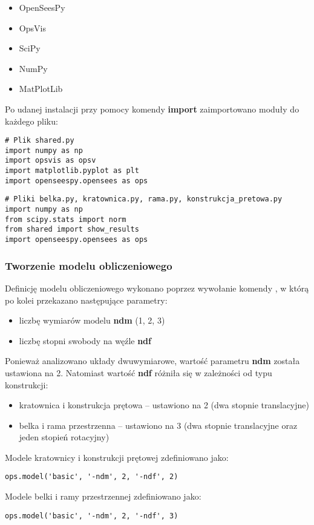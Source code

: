 \begin{itemize}
    \item OpenSeesPy
    \item OpsVis
    \item SciPy
    \item NumPy
    \item MatPlotLib
\end{itemize}

Po udanej instalacji przy pomocy komendy \textbf{import} zaimportowano moduły do każdego pliku:

\begin{lstlisting}
# Plik shared.py
import numpy as np
import opsvis as opsv
import matplotlib.pyplot as plt
import openseespy.opensees as ops
\end{lstlisting}

\begin{lstlisting}
# Pliki belka.py, kratownica.py, rama.py, konstrukcja_pretowa.py
import numpy as np
from scipy.stats import norm
from shared import show_results
import openseespy.opensees as ops
\end{lstlisting}

\subsubsection{Tworzenie modelu obliczeniowego}

Definicję modelu obliczeniowego wykonano poprzez wywołanie komendy
, w którą po kolei przekazano następujące parametry:

\begin{itemize}
    \item liczbę wymiarów modelu \textbf{ndm} (1, 2, 3)
    \item liczbę stopni swobody na węźle \textbf{ndf}
\end{itemize}

Ponieważ analizowano układy dwuwymiarowe, wartość parametru \textbf{ndm} została ustawiona na 2.
Natomiast wartość \textbf{ndf} różniła się w zależności od typu konstrukcji:
\begin{itemize}
    \item kratownica i konstrukcja prętowa – ustawiono na 2 (dwa stopnie translacyjne)
    \item belka i rama przestrzenna – ustawiono na 3 (dwa stopnie translacyjne oraz jeden stopień rotacyjny)
\end{itemize}
Modele kratownicy i konstrukcji prętowej zdefiniowano jako:
\begin{lstlisting}
ops.model('basic', '-ndm', 2, '-ndf', 2)
\end{lstlisting}
Modele belki i ramy przestrzennej zdefiniowano jako:
\begin{lstlisting}
ops.model('basic', '-ndm', 2, '-ndf', 3)
\end{lstlisting}

